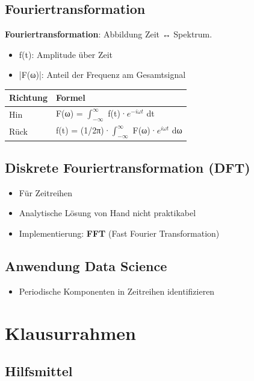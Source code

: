 \documentclass[11pt, a4paper]{article}
\begin{document}
\subsection{Fouriertransformation}
\textbf{Fouriertransformation}: Abbildung Zeit ↔ Spektrum.

\begin{itemize}
  \item f(t): Amplitude über Zeit
  \item |F(ω)|: Anteil der Frequenz am Gesamtsignal
\end{itemize}


{\small
\begin{tabularx}{\linewidth}{XX}
\hline
\rowcolor{tableheadbg}
{\color{white}\textbf{Richtung}} & {\color{white}\textbf{Formel}} \\[2pt]
\hline
\endhead
\hline
\endfoot
Hin & F(ω) = $\int_{−∞}^{∞}$ f(t)·$e^{−iωt}$ dt \\
Rück & f(t) = (1/2π)·$\int_{−∞}^{∞}$ F(ω)·$e^{iωt}$ dω \\
\end{tabularx}
}



\subsection{Diskrete Fouriertransformation (DFT)}
\begin{itemize}
  \item Für Zeitreihen
  \item Analytische Lösung von Hand nicht praktikabel
  \item Implementierung: \textbf{FFT} (Fast Fourier Transformation)
\end{itemize}


\subsection{Anwendung Data Science}
\begin{itemize}
  \item Periodische Komponenten in Zeitreihen identifizieren
\end{itemize}


\section{Klausurrahmen}


\subsection{Hilfsmittel}
\end{document}
